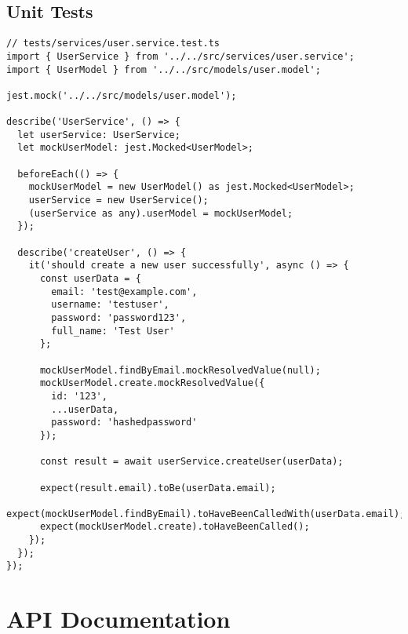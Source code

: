 \documentclass[12pt,a4paper]{article}
\begin{document}
\subsection{Unit Tests}
\begin{lstlisting}[caption=Example Unit Test]
// tests/services/user.service.test.ts
import { UserService } from '../../src/services/user.service';
import { UserModel } from '../../src/models/user.model';

jest.mock('../../src/models/user.model');

describe('UserService', () => {
  let userService: UserService;
  let mockUserModel: jest.Mocked<UserModel>;

  beforeEach(() => {
    mockUserModel = new UserModel() as jest.Mocked<UserModel>;
    userService = new UserService();
    (userService as any).userModel = mockUserModel;
  });

  describe('createUser', () => {
    it('should create a new user successfully', async () => {
      const userData = {
        email: 'test@example.com',
        username: 'testuser',
        password: 'password123',
        full_name: 'Test User'
      };

      mockUserModel.findByEmail.mockResolvedValue(null);
      mockUserModel.create.mockResolvedValue({
        id: '123',
        ...userData,
        password: 'hashedpassword'
      });

      const result = await userService.createUser(userData);

      expect(result.email).toBe(userData.email);
      expect(mockUserModel.findByEmail).toHaveBeenCalledWith(userData.email);
      expect(mockUserModel.create).toHaveBeenCalled();
    });
  });
});
\end{lstlisting}

\section{API Documentation}
\end{document}
